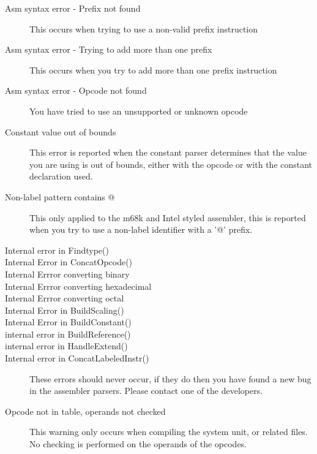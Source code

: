 \begin{description}
\item [Asm syntax error - Prefix not found]
This occurs when trying to use a non-valid prefix instruction

\item [Asm syntax error - Trying to add more than one prefix]
This occurs when you try to add more than one prefix instruction

\item [Asm syntax error - Opcode not found]
You have tried to use an unsupported or unknown opcode

\item [Constant value out of bounds]
This error is reported when the constant parser determines that the
value you are using is out of bounds, either with the opcode or with
the constant declaration used.

\item [Non-label pattern contains @]
This only applied to the m68k and Intel styled assembler, this is reported
when you try to use a non-label identifier with a '@' prefix.
\item [Internal error in Findtype()]
\item [Internal Error in ConcatOpcode()]
\item [Internal Errror converting binary]
\item [Internal Errror converting hexadecimal]
\item [Internal Errror converting octal]
\item [Internal Error in BuildScaling()]
\item [Internal Error in BuildConstant()]
\item [internal error in BuildReference()]
\item [internal error in HandleExtend()]
\item [Internal error in ConcatLabeledInstr()]
\label{InternalError}
These errors should never occur, if they do then you have found
a new bug in the assembler parsers. Please contact one of the
developers.
\item [Opcode not in table, operands not checked]
This warning only occurs when compiling the system unit, or related
files. No checking is performed on the operands of the opcodes.


\end{description}
